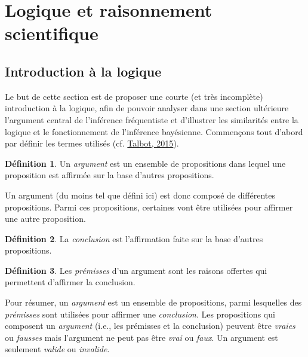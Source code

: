 \documentclass[
  a4paper,11pt,twoside,onecolumn,openright,final,oldfontcommands]{memoir}
\theoremstyle{definition}
\newtheorem{definition}{Définition}[chapter]
\theoremstyle{definition}
\theoremstyle{definition}
\theoremstyle{definition}
\theoremstyle{remark}
\begin{document}
\hypertarget{logique-et-raisonnement-scientifique}{%
\section{Logique et raisonnement scientifique}\label{logique-et-raisonnement-scientifique}}

\hypertarget{introduction-uxe0-la-logique}{%
\subsection{Introduction à la logique}\label{introduction-uxe0-la-logique}}

Le but de cette section est de proposer une courte (et très incomplète) introduction à la logique, afin de pouvoir analyser dans une section ultérieure l'argument central de l'inférence fréquentiste et d'illustrer les similarités entre la logique et le fonctionnement de l'inférence bayésienne. Commençons tout d'abord par définir les termes utilisés (cf. \protect\hyperlink{ref-talbot_critical_2015}{Talbot, 2015}).

\begin{definition}
\protect\hypertarget{def:argument}{}\label{def:argument}Un \emph{argument} est un ensemble de propositions dans lequel une proposition est affirmée sur la base d'autres propositions.
\end{definition}

Un argument (du moins tel que défini ici) est donc composé de différentes propositions. Parmi ces propositions, certaines vont être utilisées pour affirmer une autre proposition.

\begin{definition}
\protect\hypertarget{def:concusion}{}\label{def:concusion}La \emph{conclusion} est l'affirmation faite sur la base d'autres propositions.
\end{definition}

\begin{definition}
\protect\hypertarget{def:prémisse}{}\label{def:prémisse}Les \emph{prémisses} d'un argument sont les raisons offertes qui permettent d'affirmer la conclusion.
\end{definition}

Pour résumer, un \emph{argument} est un ensemble de propositions, parmi lesquelles des \emph{prémisses} sont utilisées pour affirmer une \emph{conclusion}. Les propositions qui composent un \emph{argument} (i.e., les prémisses et la conclusion) peuvent être \emph{vraies} ou \emph{fausses} mais l'argument ne peut pas être \emph{vrai} ou \emph{faux}. Un argument est seulement \emph{valide} ou \emph{invalide}.
\end{document}
